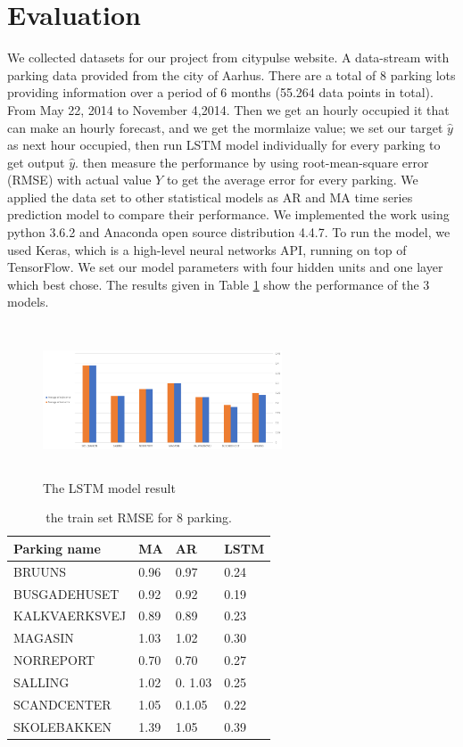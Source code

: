 \documentclass[10pt, conference, compsocconf]{IEEEtran}
\begin{document}
\section{Evaluation}
We collected datasets for our project from citypulse website. A data-stream with parking data provided from the city of Aarhus. There are a total of 8 parking lots providing information over a period of 6 months (55.264 data points in total). From May 22, 2014 to November 4,2014. Then we get an hourly occupied it that can make an hourly forecast, and  we get the  mormlaize value; we set our target $\hat y$ as next hour occupied, then run LSTM model individually for every parking to get output $\hat y $.  then measure the performance by using root-mean-square error (RMSE) with actual value \(Y\) to get the average error for every parking. We applied the data set to other statistical models as AR and MA time series prediction model to compare their performance. 
We implemented the work using python 3.6.2 and Anaconda open source distribution 4.4.7. To run the model, we used Keras, which is a high-level neural networks API, running on top of TensorFlow. We set our model parameters with four hidden units and one layer which best chose. The results given in Table \ref{table:1} show the  performance of the 3 models.
\begin{figure}[h]
 \includegraphics[width=7.1cm, height=4.5cm]{result}
 \caption{\footnotesize The LSTM model result}
 \label{fig:result}
\end{figure}
\begin{table}[h!]
\begin{tabular}{ | m{3cm} | m{1cm}| m{1cm} | m{1cm} | } 
\hline
Parking name & MA & AR& LSTM\\ 
\hline
BRUUNS& 0.96 & 0.97 &0.24\\ 
\hline
BUSGADEHUSET & 0.92 & 0.92&0.19 \\ 
\hline
KALKVAERKSVEJ & 0.89 & 0.89 &0.23\\ 
\hline
MAGASIN & 1.03 & 1.02& 0.30\\ 
\hline
NORREPORT & 0.70 &0.70 &0.27\\ 
\hline
SALLING & 1.02 & 0. 1.03&0.25\\ 
\hline
SCANDCENTER & 1.05 & 0.1.05& 0.22\\ 
\hline
SKOLEBAKKEN & 1.39 & 1.05& 0.39\\ 
\hline
\end{tabular}

\caption{\footnotesize the train set RMSE for 8 parking.}
\label{table:1}
\end{table}
\end{document}
